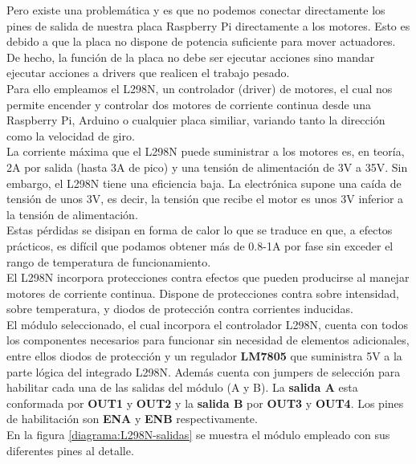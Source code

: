 Pero existe una problemática y es que no podemos conectar directamente los pines de salida de nuestra placa Raspberry Pi directamente a los motores. Esto es debido a
que la placa no dispone de potencia suficiente para mover actuadores. De hecho, la función de la placa no debe ser ejecutar acciones sino mandar ejecutar acciones a drivers que realicen
el trabajo pesado.\\

Para ello empleamos el L298N, un controlador (driver) de motores, el cual nos permite encender y controlar dos motores de corriente continua desde una Raspberry Pi, Arduino o cualquier placa similiar,
variando tanto la dirección como la velocidad de giro.\\

La corriente máxima que el L298N puede suministrar a los motores es, en teoría, 2A por salida (hasta 3A de pico) y una tensión de alimentación de 3V a 35V. Sin embargo, el L298N tiene una 
eficiencia baja. La electrónica supone una caída de tensión de unos 3V, es decir, la tensión que recibe el motor es unos 3V inferior a la tensión de alimentación.\\

Estas pérdidas se disipan en forma de calor lo que se traduce en que, a efectos prácticos, es difícil que podamos obtener más de 0.8-1A por fase sin exceder el rango de temperatura de funcionamiento.\\

El L298N incorpora protecciones contra efectos que pueden producirse al manejar motores de corriente continua. Dispone de protecciones contra sobre intensidad, sobre temperatura, y diodos de protección
contra corrientes inducidas.\\

El módulo seleccionado, el cual incorpora el controlador L298N, cuenta con todos los componentes necesarios para funcionar sin necesidad de elementos adicionales, entre ellos diodos de protección
y un regulador \textbf{LM7805} que suministra 5V a la parte lógica del integrado L298N. Además cuenta con jumpers de selección para habilitar cada una de las salidas del módulo (A y B).
La \textbf{salida A} esta conformada por \textbf{OUT1} y \textbf{OUT2} y la \textbf{salida B} por \textbf{OUT3} y \textbf{OUT4}. Los pines de habilitación son \textbf{ENA} y \textbf{ENB} respectivamente.\\

En la figura \ref{diagrama:L298N-salidas} se muestra el módulo empleado con sus diferentes pines al detalle.\\



